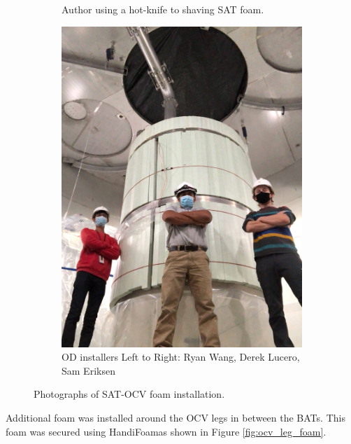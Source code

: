 \begin{figure}[!htbp]
\begin{subfigure}{.5\textwidth}
  \caption{Author using a hot-knife to shaving SAT foam.}
  \label{fig:foam_saving}
  \end{subfigure}
  \begin{subfigure}{.5\textwidth}
  \centering
  \includegraphics[width=\linewidth]{Figures/Construction/SAT_foam_fittest.jpg}
  \caption{OD installers Left to Right: Ryan Wang, Derek Lucero, Sam Eriksen}
  \end{subfigure}
\caption{Photographs of SAT-OCV foam installation.}
\label{fig:SAT_foam_installation}
\end{figure}

\par
Additional foam was installed around the OCV legs in between the BATs.
This foam was secured using HandiFoam\textregistered as shown in Figure \ref{fig:ocv_leg_foam}.

